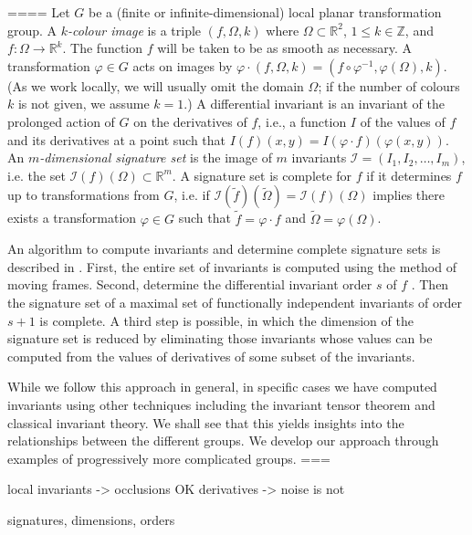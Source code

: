 \documentclass[review,onefignum,onetabnum]{siamonline190516}
\def\R{\mathbb{R}}
\begin{document}
====
Let $G$ be a (finite or infinite-dimensional) local planar transformation
group.  A {\em $k$-colour image} is a triple $(f,\Omega,k)$ where
$\Omega\subset\R^2$, $1\le k\in\mathbb{Z}$, and $f\colon\Omega\to\R^k$. The
function $f$ will be taken to be as smooth as necessary.  A transformation
$\varphi\in G$ acts on images by $\varphi\cdot (f,\Omega,k) =
(f\circ\varphi^{-1},\varphi(\Omega),k)$.  (As we work locally, we will
usually omit the domain $\Omega$; if the number of colours $k$ is not
given, we assume $k=1$.)  A differential invariant is an invariant of the
prolonged action of $G$ on the derivatives of $f$, i.e., a function $I$ of
the values of $f$ and its derivatives at a point such that $I(f)(x,y) =
I(\varphi\cdot f)(\varphi(x,y))$. An {\em $m$-dimensional signature set} is
the image of $m$ invariants $\mathcal{I}=(I_1,I_2,\dots,I_m)$, i.e. the set
$\mathcal{I}(f)(\Omega)\subset \mathbb{R}^m$.  A signature set is complete
for $f$ if it determines $f$ up to transformations from $G$, i.e. if
$\mathcal{I}(\tilde f)(\tilde\Omega) = \mathcal{I}(f)(\Omega)$ implies
there exists a transformation $\varphi\in G$ such that $\tilde f =
\varphi\cdot f$ and $\tilde \Omega = \varphi(\Omega)$.

An algorithm to compute invariants and determine complete signature sets is
described in \cite{olver2001}. First, the entire set of invariants is
computed using the method of moving frames. Second, determine the
differential invariant order $s$ of $f$ . Then the signature set of a maximal
set of functionally independent invariants of order $s+1$ is complete. A
third step is possible, in which the dimension of the signature set is
reduced by eliminating those invariants whose values can be computed from the
values of derivatives of some subset of the invariants.

While we follow this approach in general, in specific cases we have computed invariants using other techniques
including the invariant tensor theorem and classical invariant theory. We shall see that this yields insights into the relationships between the different groups. We develop our approach through examples of progressively more complicated groups.
===

local invariants -> occlusions OK
derivatives -> noise is not

signatures, dimensions, orders
\end{document}
